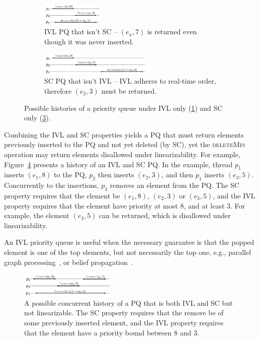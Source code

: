 \begin{figure}[htb]
  \begin{subfigure}[b]{.45\linewidth}
      \includegraphics[width=0.32\textwidth]{graphics/ivl/PQIVLnotSC.png}
  \caption{IVL PQ that isn't SC -- $(e_x,7)$ is returned even though it was never inserted.}
  \label{ivl-fig:PQ-IVL-not-SC}
  \end{subfigure}
  \begin{subfigure}[b]{.55\linewidth}
    \includegraphics[width={0.58\textwidth}]{graphics/ivl/PQSCnotIVL.png}
  \caption{SC PQ that isn't IVL -- IVL adheres to real-time order, therefore $(e_2,3)$ must be returned.}
  \label{ivl-fig:SC-IVL-not-IVL}
  \end{subfigure}
  \caption{Possible histories of a priority queue under IVL only (\ref{ivl-fig:PQ-IVL-not-SC}) and SC only (\ref{ivl-fig:SC-IVL-not-IVL}).}
\end{figure}

Combining the IVL and SC properties yields a PQ that must return elements previously inserted
to the PQ and not yet deleted (by SC), yet the \textsc{deleteMin} operation may return elements
disallowed under linearizability. For example, Figure~\ref{ivl-fig:SC-IVL-and-SC} presents
a history of an IVL and SC PQ. In the
example, thread $p_1$ inserts $(e_1,8)$ to the PQ, $p_2$ then inserts $(e_2,3)$, and
then $p_1$ inserts $(e_3, 5)$. Concurrently to the insertions, $p_3$ removes an element
from the PQ. The SC property requires that the element be $(e_1,8)$, $(e_2,3)$ or $(e_3,5)$,
and the IVL property requires that the element have priority at most $8$, and at least $3$.
For example, the element $(e_3, 5)$ can be returned, which is disallowed under linearizability.

An IVL priority queue is useful when the necessary guarantee is that the popped element is one of the
top elements, but not necessarily the top one, e.g., parallel graph processing~\cite{gonzalez2012powergraph},
or belief propagation~\cite{aksenov2020scalable}.

\begin{figure}[b]
  \centering
  \includegraphics[width=0.4\textwidth]{graphics/ivl/PQIVLandSC.png}
  \caption{A possible concurrent history of a PQ that is both IVL and SC but not linearizable. The SC property requires that the remove be of some previously inserted element, and the IVL property requires that the element have a priority bound between $8$ and $3$.}
  \label{ivl-fig:SC-IVL-and-SC}
\end{figure}
